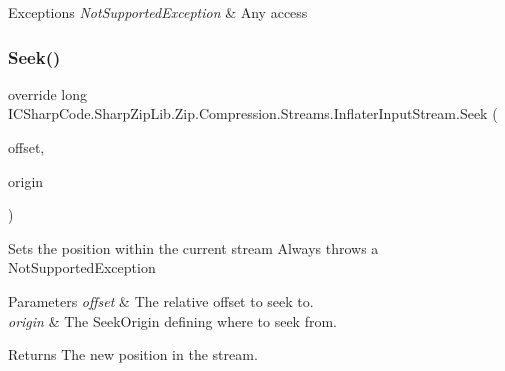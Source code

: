 \begin{DoxyExceptions}{Exceptions}
{\em Not\+Supported\+Exception} & Any access\\
\hline
\end{DoxyExceptions}
\mbox{\label{class_i_c_sharp_code_1_1_sharp_zip_lib_1_1_zip_1_1_compression_1_1_streams_1_1_inflater_input_stream_ade431915c314b6f8fb4c08f6f55ce14d}} 
\subsubsection{\texorpdfstring{Seek()}{Seek()}\hspace{0.1cm}{\footnotesize\ttfamily [2/2]}}
{\footnotesize\ttfamily override long I\+C\+Sharp\+Code.\+Sharp\+Zip\+Lib.\+Zip.\+Compression.\+Streams.\+Inflater\+Input\+Stream.\+Seek (\begin{DoxyParamCaption}\item[{long}]{offset,  }\item[{Seek\+Origin}]{origin }\end{DoxyParamCaption})\hspace{0.3cm}{\ttfamily [inline]}}



Sets the position within the current stream Always throws a Not\+Supported\+Exception 


\begin{DoxyParams}{Parameters}
{\em offset} & The relative offset to seek to.\\
\hline
{\em origin} & The Seek\+Origin defining where to seek from.\\
\hline
\end{DoxyParams}
\begin{DoxyReturn}{Returns}
The new position in the stream.
\end{DoxyReturn}

